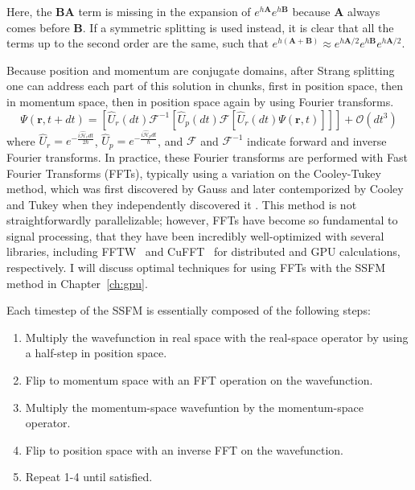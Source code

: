 \noindent Here, the $\mathbf{BA}$ term is missing in the expansion of $e^{h\mathbf{A}}e^{h\mathbf{B}}$ because $\mathbf{A}$ always comes before $\mathbf{B}$.
If a symmetric splitting is used instead, it is clear that all the terms up to the second order are the same, such that $e^{h(\mathbf{A}+\mathbf{B})} \approx e^{h\mathbf{A}/2}e^{h\mathbf{B}}e^{h\mathbf{A}/2}$.

Because position and momentum are conjugate domains, after Strang splitting one can address each part of this solution in chunks, first in position space, then in momentum space, then in position space again by using Fourier transforms.
\begin{equation}
\Psi(\mathbf{r}, t+dt) = \left[\hat{U}_r(dt)\mathcal{F}^{-1}\left[\hat{U}_p(dt) \mathcal{F} \left[\hat{U}_r(dt) \Psi(\mathbf{r},t) \right] \right] \right] + \mathcal{O}(dt^3)
\end{equation}
\noindent where $\hat{U}_r = e^{-\frac{i\mathcal{\hat{H}}_vdt}{2\hbar}}$, $\hat{U}_p = e^{-\frac{i\mathcal{\hat{H}}_pdt}{\hbar}}$, and $\mathcal{F}$ and $\mathcal{F}^{-1}$ indicate forward and inverse Fourier transforms.
In practice, these Fourier transforms are performed with Fast Fourier Transforms (FFTs), typically using a variation on the Cooley-Tukey method, which was first discovered by Gauss and later contemporized by Cooley and Tukey when they independently discovered it \cite{cooley1965}.
This method is not straightforwardly parallelizable; however, FFTs have become so fundamental to signal processing, that they have been incredibly well-optimized with several libraries, including FFTW~\cite{frigo1998} and CuFFT~\cite{fatica2008} for distributed and GPU calculations, respectively.
I will discuss optimal techniques for using FFTs with the SSFM method in Chapter~\ref{ch:gpu}.

Each timestep of the SSFM is essentially composed of the following steps:

\begin{enumerate}
\item Multiply the wavefunction in real space with the real-space operator by using a half-step in position space.
\item Flip to momentum space with an FFT operation on the wavefunction.
\item Multiply the momentum-space wavefuntion by the momentum-space operator.
\item Flip to position space with an inverse FFT on the wavefunction.
\item Repeat 1-4 until satisfied.
\end{enumerate}

